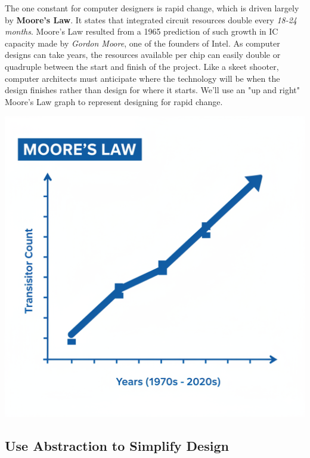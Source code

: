 \documentclass[a4paper,10pt]{article}
\begin{document}
\begin{minipage}[t]{0.7\linewidth}
The one constant for computer designers is rapid change, which is driven largely by \textbf{Moore's Law}. It states that integrated circuit resources double every \textit{18-24 months}. Moore's Law resulted from a 1965 prediction of such growth in IC capacity made by \textit{Gordon Moore}, one of the founders of Intel. As computer designs can take years, the resources available per chip can easily double or quadruple between the start and finish of the project. Like a skeet shooter, computer architects must anticipate where the technology will be when the design finishes rather than design for where it starts. We'll use an "up and right" Moore's Law graph to represent designing for rapid change.
\end{minipage}
\hfill
\begin{minipage}[t]{0.28\linewidth}
    \centering
    \includegraphics[width=\linewidth]{resources/8_great_ideas_of_computer_architecture/moores_law.png}
\end{minipage}

\bigskip

\subsection{Use Abstraction to Simplify Design}
\end{document}

